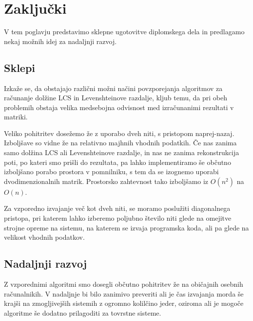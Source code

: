 \documentclass[a4paper,12pt,openright]{book}
\begin{document}
\chapter{Zaključki}

V tem poglavju predstavimo sklepne ugotovitve diplomskega dela in predlagamo nekaj možnih idej za nadaljnji razvoj.

\section{Sklepi}

Izkaže se, da obstajajo različni možni načini povzporejanja algoritmov za računanje dolžine LCS in Levenshteinove razdalje, kljub temu, da pri obeh problemih obstaja velika medsebojna odvisnost med izračunanimi rezultati v matriki. 

Veliko pohitritev dosežemo že z uporabo dveh niti, s pristopom naprej-nazaj. Izboljšave so vidne že na relativno majhnih vhodnih podatkih. Če nas zanima samo dolžina LCS ali Levenshteinove razdalje, in nas ne zanima rekonstrukcija poti, po kateri smo prišli do rezultata, pa lahko implementiramo še občutno izboljšano porabo prostora v pomnilniku, s tem da se izognemo uporabi dvodimenzionalnih matrik. Prostorsko zahtevnost tako izboljšamo iz \begin{math}O(n^2)\end{math} na \begin{math}O(n)\end{math}. 

Za vzporedno izvajanje več kot dveh niti, se moramo poslužiti diagonalnega pristopa, pri katerem lahko izberemo poljubno število niti glede na omejitve strojne opreme na sistemu, na katerem se izvaja programska koda, ali pa glede na velikost vhodnih podatkov. 

\section{Nadaljnji razvoj}

Z vzporednimi algoritmi smo dosegli občutno pohitritev že na običajnih osebnih računalnikih. V nadaljnje bi bilo zanimivo preveriti ali je čas izvajanja morda še krajši na zmogljivejših sistemih z ogromno kolilčino jeder, oziroma ali je mogoče algoritme še dodatno prilagoditi za tovrstne sisteme. 



\raggedright




\printbibliography[heading=bibintoc,title={Literatura}]
\end{document}
